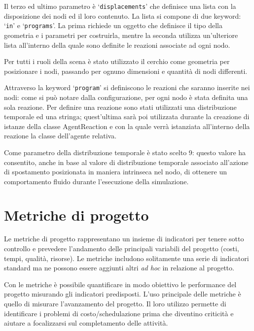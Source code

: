 Il terzo ed ultimo parametro è `\texttt{displacements}' che definisce una lista con la disposizione dei nodi ed il loro contenuto.
%
La lista si compone di due keyword: `\texttt{in}' e `\texttt{programs}'. La prima richiede un oggetto che definisce il tipo della geometria e i parametri per costruirla, mentre la seconda utilizza un'ulteriore lista all'interno della quale sono definite le reazioni associate ad ogni nodo.

Per tutti i ruoli della scena è stato utilizzato il cerchio come geometria per posizionare i nodi, passando per ognuno dimensioni e quantità di nodi differenti.

Attraverso la keyword `\texttt{program}' si definiscono le reazioni che saranno inserite nei nodi: come si può notare dalla configurazione, per ogni nodo è stata definita una sola reazione.
Per definire una reazione sono stati utilizzati una distribuzione temporale ed una stringa; quest'ultima sarà poi utilizzata durante la creazione di istanze della classe AgentReaction e con la quale verrà istanziata all'interno della reazione la classe dell'agente relativa.

Come parametro della distribuzione temporale è stato scelto 9: questo valore ha consentito, anche in base al valore di distribuzione temporale associato all'azione di spostamento posizionata in maniera intrinseca nel nodo, di ottenere un comportamento fluido durante l'esecuzione della simulazione.


\section{Metriche di progetto}
Le metriche di progetto rappresentano un insieme di indicatori per tenere sotto controllo e prevedere l'andamento delle principali variabili del progetto (costi, tempi, qualità, risorse).
Le metriche includono solitamente una serie di indicatori standard ma ne possono essere aggiunti altri \textit{ad hoc} in relazione al progetto.

Con le metriche è possibile quantificare in modo obiettivo le performance del progetto misurando gli indicatori predisposti. L'uso principale delle metriche è quello di misurare l'avanzamento del progetto. Il loro utilizzo permette di identificare i problemi di costo/schedulazione prima che diventino criticità e aiutare a focalizzarsi sul completamento delle attività.

